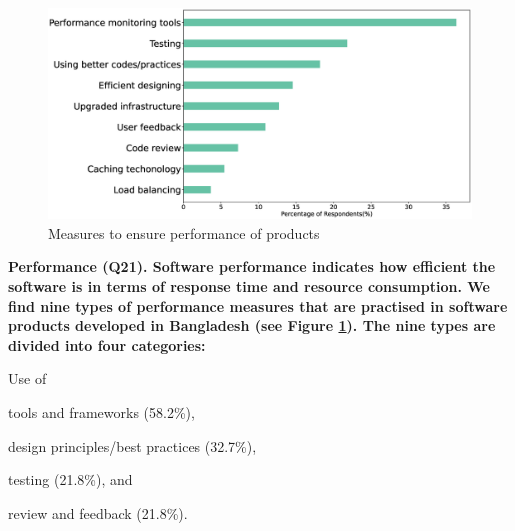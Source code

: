 \begin{figure}[h]
\centering
\includegraphics[scale=0.22]{Figures/Performance.eps} 
\caption{Measures to ensure performance of products}
\label{fig:Measures to ensure performance}
\end{figure}
\nd\bf{Performance (Q21).} Software performance indicates how efficient the software is in terms of response time and resource consumption. 
We find nine types of performance measures that are practised in software products developed in Bangladesh (see Figure \ref{fig:Measures to ensure performance}).  
The nine types are divided into four categories: 
\begin{inparaenum}
Use of \item tools and frameworks (58.2\%),
\item design principles/best practices (32.7\%),
\item testing (21.8\%), and
\item review and feedback (21.8\%).
\end{inparaenum} 

